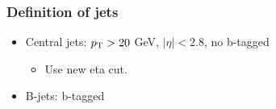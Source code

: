 \documentclass[mathserif,serif]{beamer}
\begin{document}

\begin{frame}
\frametitle{Definition of jets}
\normalsize
\begin{itemize}
\item Central jets: $p_{\text{T}}>20$ GeV, $|\eta|<2.8$, no b-tagged
\begin{itemize}
\item Use new eta cut.
\end{itemize}
\item B-jets: b-tagged
\end{itemize}
\end{frame}
\end{document}
